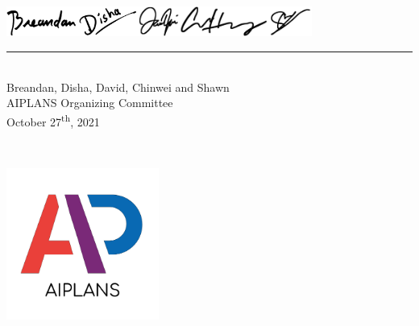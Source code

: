 \documentclass[12pt,landscape]{article}
\begin{document}
	\vskip 0.7cm
	\begin{minipage}{0.17\textwidth}
		~
	\end{minipage}
	\begin{minipage}{0.4\textwidth}
		\includegraphics[height=1cm]{../png/breandan}\includegraphics[height=1cm]{../png/disha}\includegraphics[height=1cm]{../png/david}\hskip 3pt\includegraphics[height=1cm]{../png/chinwei}\includegraphics[height=1cm]{../png/shawn}\\[-20pt]
		\rule{10.3cm}{1pt}\\[5pt]
		Breandan, Disha, David, Chinwei and Shawn\\
		AIPLANS Organizing Committee \\
		October 27\textsuperscript{th}, 2021
	\end{minipage}
	\begin{minipage}{0.02\textwidth}
		~
	\end{minipage}
	\begin{minipage}{0.30\textwidth}
		\includegraphics[width=5cm]{../png/logo}
	\end{minipage}


	\vfill
\end{document}
